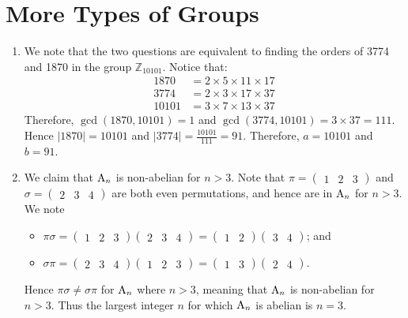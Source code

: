 \section{More Types of Groups}
\begin{enumerate}    
    \item We note that the two questions are equivalent to finding the orders of 3774 and 1870 in the group $\mathbb{Z}_{10101}$. Notice that:
    \begin{align*}
        1870 &= 2 \times 5 \times 11 \times 17\\
        3774 &= 2 \times 3 \times 17 \times 37\\
        10101 &= 3 \times 7 \times 13 \times 37
    \end{align*}
    Therefore, $\gcd(1870, 10101) = 1$ and $\gcd(3774, 10101) = 3 \times 37 = 111$. Hence $|1870| = 10101$ and $|3774| = \frac{10101}{111} = 91$. Therefore, $a = 10101$ and $b = 91$.

    \item We claim that $\mathrm{A}_{n}$ is non-abelian for $n > 3$. Note that $\pi = \begin{pmatrix}1 & 2 & 3\end{pmatrix}$ and $\sigma = \begin{pmatrix}2 & 3 & 4\end{pmatrix}$ are both even permutations, and hence are in $\mathrm{A}_{n}$ for $n > 3$. We note
    \begin{itemize}
        \item $\pi\sigma = \begin{pmatrix}1 & 2 & 3\end{pmatrix}\begin{pmatrix}2 & 3 & 4\end{pmatrix} = \begin{pmatrix}1 & 2\end{pmatrix}\begin{pmatrix}3 & 4\end{pmatrix}$; and
        \item $\sigma\pi = \begin{pmatrix}2 & 3 & 4\end{pmatrix}\begin{pmatrix}1 & 2 & 3\end{pmatrix} = \begin{pmatrix}1 & 3\end{pmatrix}\begin{pmatrix}2 & 4\end{pmatrix}$.
    \end{itemize}
    Hence $\pi\sigma \neq \sigma\pi$ for $\mathrm{A}_{n}$ where $n > 3$, meaning that $\mathrm{A}_{n}$ is non-abelian for $n > 3$. Thus the largest integer $n$ for which $\mathrm{A}_{n}$ is abelian is $n = 3$.
    

\end{enumerate}
